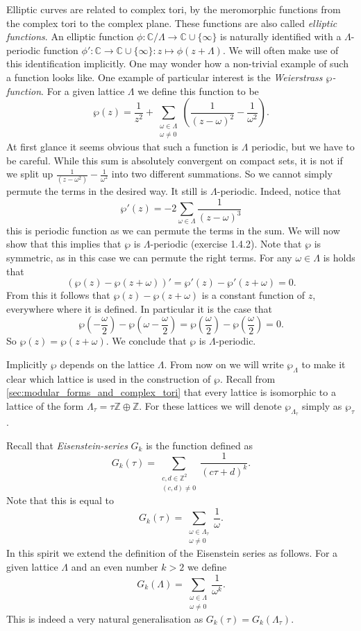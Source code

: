 \documentclass[titlepage,a4paper]{article}
\theoremstyle{theoremdd}
\theoremstyle{definitiondd}
\theoremstyle{remarkdd}
\newcommand{\Z}{\mathbb{Z}}
\newcommand{\C}{\mathbb{C}}
\begin{document}
Elliptic curves are related to complex tori, by the meromorphic functions from the complex tori to the complex plane. These functions are also called \emph{elliptic functions}. 
An elliptic function $\phi: \C / \Lambda \to \C \cup \{\infty\} $ is naturally identified with a  $\Lambda$-periodic function $\phi': \C \to \C \cup \{\infty\}: z \mapsto \phi(z + \Lambda)$. 
We will often make use of this identification implicitly. 
One may wonder how a non-trivial example of such a function looks like. 
One example of particular interest is the \emph{Weierstrass $\wp$-function}. 
For a given lattice  $\Lambda$ we define this function to be \[
	\wp(z) = \frac{1}{z^2} + \sum_{\substack{\omega \in \Lambda \\ \omega \ne 0}}\left( \frac{1}{(z-\omega)^2} - \frac{1}{\omega^2} \right) 
.\] 
At first glance it seems obvious that such a function is $\Lambda$ periodic, but we have to be careful. 
While this sum is absolutely convergent on compact sets, it is not if we split up $\frac{1}{(z-\omega^2)} - \frac{1}{\omega^2}$ into two different summations. So we cannot simply permute the terms in the desired way. 
It still is $\Lambda$-periodic. Indeed, notice that  \[
	\wp'(z) = -2 \sum_{\omega \in \Lambda} \frac{1}{(z - \omega)^3}
\] 
this is periodic function as we can permute the terms in the sum.
We will now show that this implies that $\wp$ is $\Lambda$-periodic (exercise 1.4.2).
Note that $\wp$ is symmetric, as in this case we can permute the right terms.
For any $\omega \in \Lambda$ is holds that 
\[
	(\wp(z) - \wp(z + \omega))' = \wp'(z) - \wp'(z+ \omega) = 0 
.\] 
From this it follows that $\wp(z) - \wp(z + \omega)$ is a constant function of $z$, everywhere where it is defined.
In particular it is the case that \[
	\wp\left(-\frac{\omega}{2}\right) - \wp\left(\omega - \frac{\omega}{2}\right) = \wp\left(\frac{\omega}{2}\right) - \wp\left(\frac{\omega}{2}\right)  = 0 
.\] 
So $\wp(z) = \wp(z+ \omega)$. 
We conclude that $\wp$ is $\Lambda$-periodic.

Implicitly $\wp$ depends on the lattice $\Lambda$. 
From now on we will write  $\wp_\Lambda$ to make it clear which lattice is used in the construction of $\wp$. 
Recall from \cref{sec:modular_forms_and_complex_tori} that every lattice is isomorphic to a lattice of the form $\Lambda_\tau = \tau\Z \oplus \Z$. For these lattices we will denote $\wp_{\Lambda_\tau}$ simply as $\wp_\tau$.

Recall that \emph{Eisenstein-series} $G_k$ is the function defined as \[
	G_k(\tau) = \sum_{\substack{c, d \in \Z^2 \\ (c, d) \ne 0}} \frac{1}{(c\tau + d)^{k}}
.\] 
Note that this is equal to \[
	G_k(\tau) = \sum_{\substack{\omega \in \Lambda_\tau \\ \omega \ne 0}} \frac{1}{\omega}
.\] 
In this spirit we extend the definition of the Eisenstein series as follows. For a given lattice $\Lambda$ and an even number  $k > 2$ we define \[
	G_k(\Lambda) = \sum_{\substack{\omega \in \Lambda \\ \omega \ne 0}} \frac{1}{\omega^{k}}
.\] 
This is indeed a very natural generalisation as $G_k(\tau) = G_k(\Lambda_\tau)$.
\end{document}
